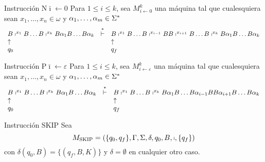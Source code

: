 \begin{frame}
  \begin{block}{Instrucción $\mathrm{N}\bar{\imath} \leftarrow 0$}
    \PN Para $1 \leq i \leq k$, sea $M_{i \leftarrow 0}^{k}$ una máquina tal que cualesquiera sean $x_{1}, \dotsc, x_{n}
    \in \omega$ y $\alpha_{1}, \dotsc,\alpha_{m} \in \Sigma^{\ast}$
    \minLetter
    \[
      \begin{array}{lcl}
        B \shortmid^{x_{1}} B \dotsc B \shortmid^{x_{k}} B \alpha_{1} B \dotsc B \alpha_{k} &\overset{\ast}{\vdash}& B
          \shortmid^{x_{1}} B \dotsc B \shortmid^{x_{i-1}} B B \shortmid^{x_{i+1}} B \dotsc B \shortmid^{x_{k}} B
          \alpha_{1} B \dotsc B \alpha_{k} \\
        \uparrow && \uparrow \\
        q_{0} & & q_{f}
      \end{array}
    \]
  \end{block}

  \begin{block}{Instrucción $\mathrm{P}\bar{\imath} \leftarrow \varepsilon$}
    \PN Para $1 \leq i \leq k$, sea $M_{i \leftarrow \varepsilon}^{k}$ una máquina tal que cualesquiera sean $x_{1},
    \dotsc, x_{n} \in \omega$ y $\alpha_{1}, \dotsc,\alpha_{m} \in \Sigma^{\ast}$
    \minLetter
    \[
      \begin{array}{lcl}
        B \shortmid^{x_{1}} B \dotsc B \shortmid^{x_{k}} B \alpha_{1} B \dotsc B \alpha_{k} &\overset{\ast}{\vdash}& B
          \shortmid^{x_{1}} B \dotsc B \shortmid^{x_{k}} B \alpha_{1} B \dotsc B \alpha_{i-1} B B \alpha_{i+1} B \dotsc
          B \alpha_{k} \\
        \uparrow && \uparrow \\
        q_{0} & & q_{f}
      \end{array}
    \]
  \end{block}

  \begin{block}{Instrucción $\mathrm{SKIP}$}
    \PN Sea
    \begin{equation*}
      M_{\mathrm{SKIP}} = \left(\{q_{0}, q_{f}\}, \Gamma, \Sigma, \delta, q_{0}, B, \shortmid, \{q_{f}\}\right)
    \end{equation*}
    \PN con $\delta(q_{0}, B) = \{(q_{f}, B, K)\}$ y $\delta = \emptyset$ en cualquier otro caso.
  \end{block}
\end{frame}

